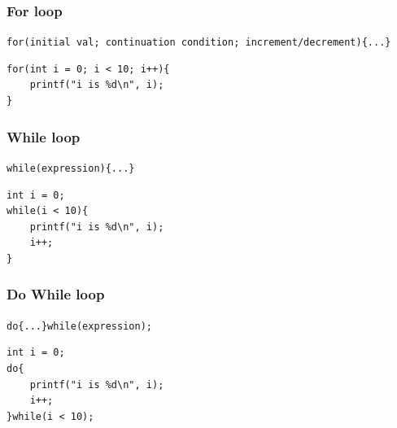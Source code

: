 \documentclass[a4paper, 10pt]{article}
\begin{document}
\subsubsection{For loop}
\texttt{for(initial val; continuation condition; increment/decrement)\{...\}}

\begin{lstlisting}[style=cStyle, caption={Print numbers from 0 to 9}]
for(int i = 0; i < 10; i++){
    printf("i is %d\n", i);
}
\end{lstlisting}
\pagebreak
\subsubsection{While loop}
\texttt{while(expression)\{...\}}
\begin{lstlisting}[style=cStyle, caption={Print numbers from 0 to 9}]
int i = 0;
while(i < 10){
    printf("i is %d\n", i);
    i++;
}
\end{lstlisting}
\subsubsection{Do While loop}
\texttt{do\{...\}while(expression);}
\begin{lstlisting}[style=cStyle, caption={Print numbers from 0 to 9}]
int i = 0;
do{
    printf("i is %d\n", i);
    i++;
}while(i < 10);
\end{lstlisting}
\end{document}
